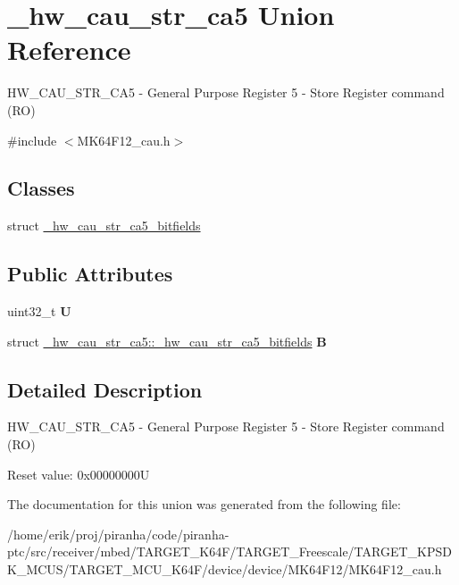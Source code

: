\hypertarget{union__hw__cau__str__ca5}{}\section{\+\_\+hw\+\_\+cau\+\_\+str\+\_\+ca5 Union Reference}
\label{union__hw__cau__str__ca5}


H\+W\+\_\+\+C\+A\+U\+\_\+\+S\+T\+R\+\_\+\+C\+A5 -\/ General Purpose Register 5 -\/ Store Register command (RO)  




{\ttfamily \#include $<$M\+K64\+F12\+\_\+cau.\+h$>$}

\subsection*{Classes}
\begin{DoxyCompactItemize}
\item 
struct \hyperlink{struct__hw__cau__str__ca5_1_1__hw__cau__str__ca5__bitfields}{\+\_\+hw\+\_\+cau\+\_\+str\+\_\+ca5\+\_\+bitfields}
\end{DoxyCompactItemize}
\subsection*{Public Attributes}
\begin{DoxyCompactItemize}
\item 
uint32\+\_\+t {\bfseries U}\hypertarget{union__hw__cau__str__ca5_a1e4fb8686fb253f5615f70c498b63782}{}\label{union__hw__cau__str__ca5_a1e4fb8686fb253f5615f70c498b63782}

\item 
struct \hyperlink{struct__hw__cau__str__ca5_1_1__hw__cau__str__ca5__bitfields}{\+\_\+hw\+\_\+cau\+\_\+str\+\_\+ca5\+::\+\_\+hw\+\_\+cau\+\_\+str\+\_\+ca5\+\_\+bitfields} {\bfseries B}\hypertarget{union__hw__cau__str__ca5_acd904b8258abf9d6166106e890d8952b}{}\label{union__hw__cau__str__ca5_acd904b8258abf9d6166106e890d8952b}

\end{DoxyCompactItemize}


\subsection{Detailed Description}
H\+W\+\_\+\+C\+A\+U\+\_\+\+S\+T\+R\+\_\+\+C\+A5 -\/ General Purpose Register 5 -\/ Store Register command (RO) 

Reset value\+: 0x00000000U 

The documentation for this union was generated from the following file\+:\begin{DoxyCompactItemize}
\item 
/home/erik/proj/piranha/code/piranha-\/ptc/src/receiver/mbed/\+T\+A\+R\+G\+E\+T\+\_\+\+K64\+F/\+T\+A\+R\+G\+E\+T\+\_\+\+Freescale/\+T\+A\+R\+G\+E\+T\+\_\+\+K\+P\+S\+D\+K\+\_\+\+M\+C\+U\+S/\+T\+A\+R\+G\+E\+T\+\_\+\+M\+C\+U\+\_\+\+K64\+F/device/device/\+M\+K64\+F12/M\+K64\+F12\+\_\+cau.\+h\end{DoxyCompactItemize}

